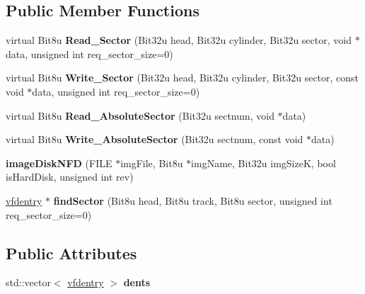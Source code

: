 \subsection*{Public Member Functions}
\begin{DoxyCompactItemize}
\item 
\hypertarget{classimageDiskNFD_a68592ca82b6289dac88f11496b1786d1}{virtual Bit8u {\bfseries Read\-\_\-\-Sector} (Bit32u head, Bit32u cylinder, Bit32u sector, void $\ast$data, unsigned int req\-\_\-sector\-\_\-size=0)}\label{classimageDiskNFD_a68592ca82b6289dac88f11496b1786d1}

\item 
\hypertarget{classimageDiskNFD_a29a3ca3ba569ad27e53736b4bdbdf6a7}{virtual Bit8u {\bfseries Write\-\_\-\-Sector} (Bit32u head, Bit32u cylinder, Bit32u sector, const void $\ast$data, unsigned int req\-\_\-sector\-\_\-size=0)}\label{classimageDiskNFD_a29a3ca3ba569ad27e53736b4bdbdf6a7}

\item 
\hypertarget{classimageDiskNFD_a3ff96b9c95f7e612a8defb028ea7d926}{virtual Bit8u {\bfseries Read\-\_\-\-Absolute\-Sector} (Bit32u sectnum, void $\ast$data)}\label{classimageDiskNFD_a3ff96b9c95f7e612a8defb028ea7d926}

\item 
\hypertarget{classimageDiskNFD_ac5a037cce6076f95d27a1b8c25f3695b}{virtual Bit8u {\bfseries Write\-\_\-\-Absolute\-Sector} (Bit32u sectnum, const void $\ast$data)}\label{classimageDiskNFD_ac5a037cce6076f95d27a1b8c25f3695b}

\item 
\hypertarget{classimageDiskNFD_a06ef012b92f133f467b5aaf062899d73}{{\bfseries image\-Disk\-N\-F\-D} (F\-I\-L\-E $\ast$img\-File, Bit8u $\ast$img\-Name, Bit32u img\-Size\-K, bool is\-Hard\-Disk, unsigned int rev)}\label{classimageDiskNFD_a06ef012b92f133f467b5aaf062899d73}

\item 
\hypertarget{classimageDiskNFD_aa4e6f7762a0c622d8c829a7bdf179f66}{\hyperlink{structimageDiskNFD_1_1vfdentry}{vfdentry} $\ast$ {\bfseries find\-Sector} (Bit8u head, Bit8u track, Bit8u sector, unsigned int req\-\_\-sector\-\_\-size=0)}\label{classimageDiskNFD_aa4e6f7762a0c622d8c829a7bdf179f66}

\end{DoxyCompactItemize}
\subsection*{Public Attributes}
\begin{DoxyCompactItemize}
\item 
\hypertarget{classimageDiskNFD_a5a8485ee6b315c4d0a77e5443d9d1e2f}{std\-::vector$<$ \hyperlink{structimageDiskNFD_1_1vfdentry}{vfdentry} $>$ {\bfseries dents}}\label{classimageDiskNFD_a5a8485ee6b315c4d0a77e5443d9d1e2f}

\end{DoxyCompactItemize}



